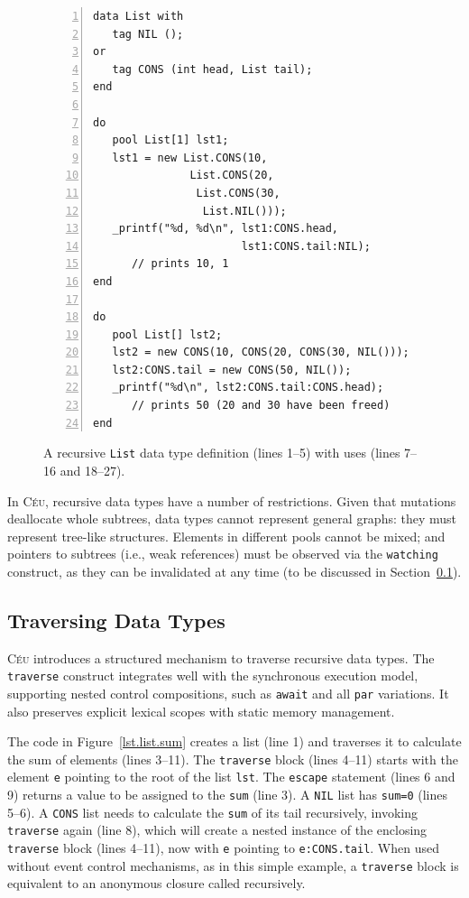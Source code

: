 \documentclass{sig-alternate}
\newcommand{\CEU}{\textsc{C\'{e}u}\xspace}
\newcommand{\code}[1] {{\small{\texttt{#1}}}}
\begin{document}

\begin{figure}[t]
\begin{lstlisting}[numbers=left,xleftmargin=3em]
data List with
   tag NIL ();
or
   tag CONS (int head, List tail);
end

do
   pool List[1] lst1;
   lst1 = new List.CONS(10,
               List.CONS(20,
                List.CONS(30,
                 List.NIL()));
   _printf("%d, %d\n", lst1:CONS.head,
                       lst1:CONS.tail:NIL);
      // prints 10, 1
end

do
   pool List[] lst2;
   lst2 = new CONS(10, CONS(20, CONS(30, NIL()));
   lst2:CONS.tail = new CONS(50, NIL());
   _printf("%d\n", lst2:CONS.tail:CONS.head);
      // prints 50 (20 and 30 have been freed)
end
\end{lstlisting}
\caption{
A recursive \code{List} data type definition (lines 1--5) with uses (lines 
7--16 and 18--27).
\label{lst.list}
}
\end{figure}

In \CEU, recursive data types have a number of restrictions.
Given that mutations deallocate whole subtrees, data types cannot represent 
general graphs: they must represent tree-like structures.
Elements in different pools cannot be mixed;
and pointers to subtrees (i.e., weak references) must be observed via the
\code{watching} construct, as they can be invalidated at any time
(to be discussed in Section~\ref{sec.traverse}).


\subsection{Traversing Data Types}
\label{sec.traverse}

\CEU introduces a structured mechanism to traverse recursive data types.
The \code{traverse} construct integrates well with the synchronous execution 
model, supporting nested control compositions, such as \code{await} and all 
\code{par} variations.
It also preserves explicit lexical scopes with static memory management.

The code in Figure~\ref{lst.list.sum} creates a list (line 1) and traverses it 
to calculate the sum of elements (lines 3--11).
The \code{traverse} block (lines 4--11) starts with the element \code{e} 
pointing to the root of the list \code{lst}.
The \code{escape} statement (lines 6 and 9) returns a value to be assigned to 
the \code{sum} (line 3).
A \code{NIL} list has \code{sum=0} (lines 5--6).
A \code{CONS} list needs to calculate the \code{sum} of its tail recursively, 
invoking \code{traverse} again (line 8), which will create a nested instance of 
the enclosing \code{traverse} block (lines 4--11), now with \code{e} pointing 
to \code{e:CONS.tail}.
%
When used without event control mechanisms, as in this simple example, a 
\code{traverse} block is equivalent to an anonymous closure called recursively.
\end{document}
